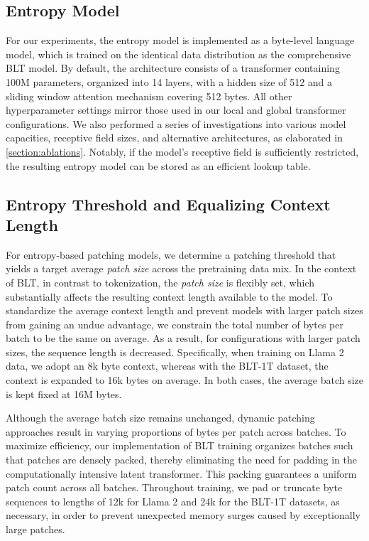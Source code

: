 \subsection{Entropy Model} For our experiments, the entropy model is implemented as a byte-level language model, which is trained on the identical data distribution as the comprehensive {\textsc BLT} model. By default, the architecture consists of a transformer containing 100M parameters, organized into 14 layers, with a hidden size of 512 and a sliding window attention mechanism covering 512 bytes. All other hyperparameter settings mirror those used in our local and global transformer configurations. We also performed a series of investigations into various model capacities, receptive field sizes, and alternative architectures, as elaborated in \autoref{section:ablations}. Notably, if the model's receptive field is sufficiently restricted, the resulting entropy model can be stored as an efficient lookup table.

\subsection{Entropy Threshold and Equalizing Context Length} For entropy-based patching models, we determine a patching threshold that yields a target average \textit{patch size} across the pretraining data mix. In the context of {\textsc BLT}, in contrast to tokenization, the \textit{patch size} is flexibly set, which substantially affects the resulting context length available to the model. To standardize the average context length and prevent models with larger patch sizes from gaining an undue advantage, we constrain the total number of bytes per batch to be the same on average. As a result, for configurations with larger patch sizes, the sequence length is decreased. Specifically, when training on Llama 2 data, we adopt an 8k byte context, whereas with the {\textsc BLT}-1T dataset, the context is expanded to 16k bytes on average. In both cases, the average batch size is kept fixed at 16M bytes.

Although the average batch size remains unchanged, dynamic patching approaches result in varying proportions of bytes per patch across batches. To maximize efficiency, our implementation of {\textsc BLT} training organizes batches such that patches are densely packed, thereby eliminating the need for padding in the computationally intensive latent transformer. This packing guarantees a uniform patch count across all batches. Throughout training, we pad or truncate byte sequences to lengths of 12k for Llama 2 and 24k for the {\textsc BLT}-1T datasets, as necessary, in order to prevent unexpected memory surges caused by exceptionally large patches.

